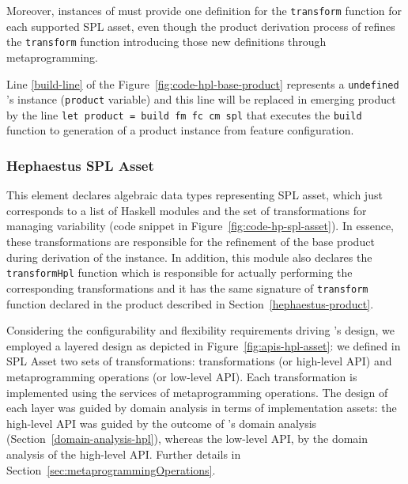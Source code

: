 
Moreover, instances of \hpl{} must provide one definition for the \texttt{transform} function for each supported SPL asset, even though the product derivation process of \hpl{} refines the \texttt{transform} function introducing those new definitions through metaprogramming.

Line \ref{build-line} of the Figure~\ref{fig:code-hpl-base-product} represents a \texttt{undefined} \hpl's instance (\texttt{product} variable) and this line will be replaced in emerging product by the line \texttt{let product = build fm fc cm spl} that executes the \texttt{build} function to generation of a product \hpl{} instance from feature configuration.



\subsubsection{Hephaestus SPL Asset} \label{hephaestus-spl-asset}

This element declares algebraic data types representing \hp{} SPL asset, which just corresponds to a list of Haskell modules and the set of transformations for managing \hpl{} variability (code snippet in Figure~\ref{fig:code-hp-spl-asset}). In essence, these transformations are responsible for the refinement of the base product during derivation of the \hpl{} instance. In addition, this module also declares the \texttt{transformHpl} function which is responsible for actually performing the corresponding \hpl{} transformations and it has the same signature of \texttt{transform} function declared in the \hp{} product described in Section~\ref{hephaestus-product}.

Considering the configurability and flexibility requirements driving \hpl's design, we employed a layered design as depicted in Figure~\ref{fig:apis-hpl-asset}: we defined in \hp{} SPL Asset two sets of transformations: \hpl{} transformations (or high-level API) and metaprogramming operations (or low-level API). Each \hpl{} transformation is implemented using the services of metaprogramming operations.
The design of each layer was guided by domain analysis in terms of implementation assets: the high-level API was guided by the outcome of \hpl{}'s domain analysis  (Section~\ref{domain-analysis-hpl}), whereas  the low-level API, by the domain analysis of the high-level API. Further details in Section~\ref{sec:metaprogrammingOperations}.

